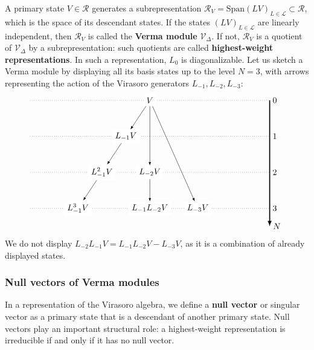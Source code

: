 \documentclass[12pt, a4paper]{article}
\theoremstyle{break}
\begin{document}
A primary state $V{} \in \mathcal{R}$ generates a subrepresentation $\mathcal{R}_{V{}}= \text{Span}(LV{})_{L\in\mathcal{L}}\subset\mathcal{R}$, which is the space of its descendant states. If the states $(LV{})_{L\in\mathcal{L}}$ are linearly independent, then $\mathcal{R}_{V{}}$ is called the \textbf{Verma module} $\mathcal{V}_\Delta$. If not, $\mathcal{R}_{V{}}$ is a quotient of $\mathcal{V}_\Delta$ by a subrepresentation: such quotients are called \textbf{highest-weight representations}. In such a representation, $L_0$ is diagonalizable. 
Let us sketch a Verma module by displaying all its basis states up to the level $N=3$, with arrows representing the action of the Virasoro generators $L_{-1},L_{-2},L_{-3}$:
\begin{align}
 \begin{tikzpicture}[scale = .25, baseline=(current  bounding  box.center)]
  \draw[-latex, very thick] (20, 0) -- (20, -21) node [right] {$N$};
  \foreach \x in {0, ..., 3}
  {
  \draw [dotted] (-20, {-6*\x}) -- (20, {-6*\x}) node [right] {${\x}$};
  }
  \node[fill = white] at (0, 0) (0) {$V{}$};
  \node[fill = white] at (-4,-6) (1) {$L_{-1}V{}$};
  \node[fill = white] at (-8, -12) (11) {$L_{-1}^2V{}$};
  \node[fill = white] at (-12, -18) (111) {$L_{-1}^3V{}$};
  \node[fill = white] at (0,-12) (2) {$L_{-2}V{}$};
  \node[fill = white] at (0,-18) (12) {$L_{-1}L_{-2}V{}$};
  \node[fill = white] at (8,-18) (3) {$L_{-3}V{}$};
  \draw[-latex] (0) -- (1);
  \draw[-latex] (1) -- (11);
  \draw[-latex] (11) -- (111);
  \draw[-latex] (0) -- (2);
  \draw[-latex] (0) -- (3);
  \draw[-latex] (2) -- (12);
 \end{tikzpicture}
\end{align}
We do not display $L_{-2}L_{-1}V = L_{-1}L_{-2}V -L_{-3}V$, as it is a combination of already displayed states. 

\subsubsection{Null vectors of Verma modules}\label{sec:nvvm}

In a representation of the Virasoro algebra, we define a \textbf{null vector} or singular vector as a primary state that is a descendant of another primary state. Null vectors play an important structural role: a highest-weight representation is irreducible if and only if it has no null vector. 
\end{document}
